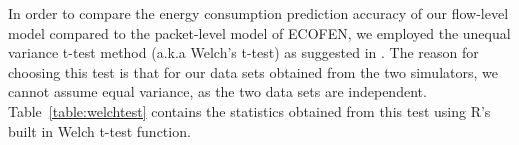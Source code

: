 In order to compare the energy consumption prediction accuracy of our flow-level model compared to the packet-level model of ECOFEN, we employed the unequal variance t-test method (a.k.a Welch's t-test) as suggested in \cite{ruxton2006unequal}. The reason for choosing this test is that for our data sets obtained from the two simulators, we cannot assume equal variance, as the two data sets are independent. Table~\ref{table:welchtest} contains the statistics obtained from this test using R's built in Welch t-test function. 

\begin{figure}[ht]
	\centering
\centering
	
\centering


\end{figure}
